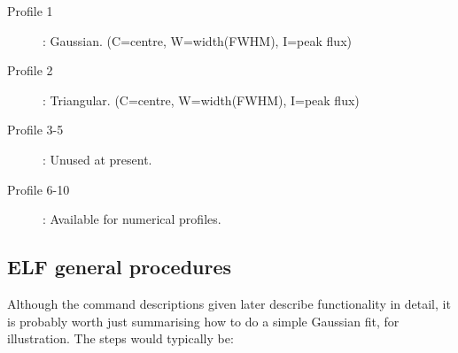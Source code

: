 \begin{description}
\begin{description}

\item [Profile 1]: Gaussian. (C=centre, W=width(FWHM), I=peak flux)

\item [Profile 2]: Triangular. (C=centre, W=width(FWHM), I=peak flux)

\item [Profile 3-5]: Unused at present.

\item [Profile 6-10]: Available for numerical profiles.

\end{description}
\end{description}

\subsection {ELF general procedures}

Although the command descriptions given later describe functionality
in detail, it is probably worth just summarising how to do a simple
Gaussian fit, for illustration.   The steps would typically be:


